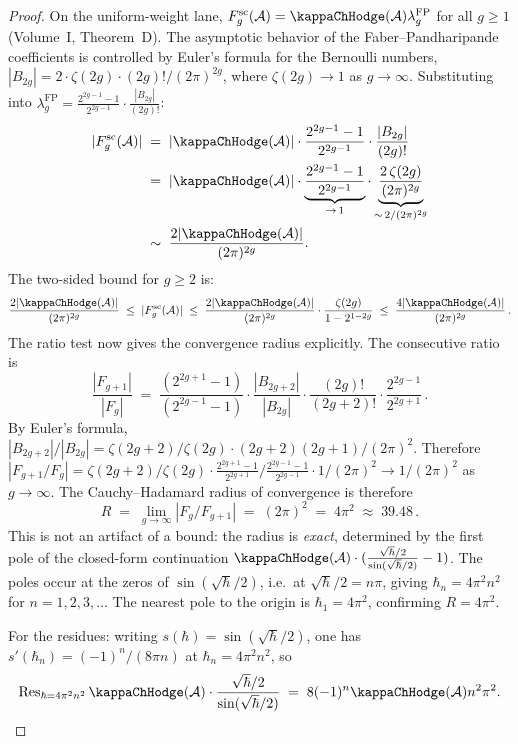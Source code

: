 \begin{proof}
On the uniform-weight lane,
$F_g^{\mathrm{sc}}(\cA)=\kappaChHodge(\cA)\lambda_g^{\mathrm{FP}}$ for all $g \geq 1$
\textup{(}Volume~I, Theorem~D\textup{)}. The asymptotic behavior of
the Faber--Pandharipande coefficients is controlled by Euler's formula for the Bernoulli numbers,
$|B_{2g}| = 2 \cdot \zeta(2g) \cdot (2g)! / (2\pi)^{2g}$, where
$\zeta(2g) \to 1$ as $g \to \infty$. Substituting into $\lambda_g^{\mathrm{FP}} = \frac{2^{2g-1}-1}{2^{2g-1}} \cdot \frac{|B_{2g}|}{(2g)!}$:
\begin{align}
|F_g^{\mathrm{sc}}(\cA)| &\;=\; |\kappaChHodge(\cA)| \cdot \frac{2^{2g-1}-1}{2^{2g-1}} \cdot \frac{|B_{2g}|}{(2g)!} \notag \\
&\;=\; |\kappaChHodge(\cA)| \cdot \underbrace{\frac{2^{2g-1}-1}{2^{2g-1}}}_{\to\,1} \cdot \underbrace{\frac{2\,\zeta(2g)}{(2\pi)^{2g}}}_{\sim\,2/(2\pi)^{2g}} \notag \\
&\;\sim\; \frac{2|\kappaChHodge(\cA)|}{(2\pi)^{2g}}. %
\end{align}
The two-sided bound for $g \geq 2$ is:
\[
\frac{2|\kappaChHodge(\cA)|}{(2\pi)^{2g}} \;\leq\; |F_g^{\mathrm{sc}}(\cA)| \;\leq\; \frac{2|\kappaChHodge(\cA)|}{(2\pi)^{2g}} \cdot \frac{\zeta(2g)}{1 - 2^{1-2g}} \;\leq\; \frac{4|\kappaChHodge(\cA)|}{(2\pi)^{2g}}\,.
\]
The ratio test now gives the convergence radius explicitly. The consecutive ratio is
\[
\frac{|F_{g+1}|}{|F_g|}
\;=\;
\frac{(2^{2g+1}-1)}{(2^{2g-1}-1)}
\cdot
\frac{|B_{2g+2}|}{|B_{2g}|}
\cdot
\frac{(2g)!}{(2g+2)!}
\cdot
\frac{2^{2g-1}}{2^{2g+1}}\,.
\]
By Euler's formula, $|B_{2g+2}|/|B_{2g}| = \zeta(2g+2)/\zeta(2g) \cdot (2g+2)(2g+1)/(2\pi)^2$.
Therefore $|F_{g+1}/F_g| = \zeta(2g+2)/\zeta(2g) \cdot \frac{2^{2g+1}-1}{2^{2g+1}} / \frac{2^{2g-1}-1}{2^{2g-1}} \cdot 1/(2\pi)^2 \to 1/(2\pi)^2$ as $g \to \infty$. The Cauchy--Hadamard radius of convergence is therefore
\[
R \;=\; \lim_{g \to \infty} |F_g/F_{g+1}| \;=\; (2\pi)^2 \;=\; 4\pi^2 \;\approx\; 39.48\,.
\]
This is not an artifact of a bound: the radius is \emph{exact}, determined by the first pole of the closed-form continuation $\kappaChHodge(\cA) \cdot (\frac{\sqrt{\hbar}/2}{\sin(\sqrt{\hbar}/2)} - 1)$. The poles occur at the zeros of $\sin(\sqrt{\hbar}/2)$,
i.e.\ at $\sqrt{\hbar}/2 = n\pi$, giving
$\hbar_n = 4\pi^2 n^2$ for $n = 1, 2, 3, \ldots$ The nearest pole to the origin is $\hbar_1 = 4\pi^2$, confirming $R = 4\pi^2$.

For the residues: writing $s(\hbar)=\sin(\sqrt{\hbar}/2)$, one
has $s'(\hbar_n)=(-1)^n/(8\pi n)$ at $\hbar_n = 4\pi^2 n^2$, so
\[
\Res_{\hbar = 4\pi^2 n^2}
\kappaChHodge(\cA) \cdot \frac{\sqrt{\hbar}/2}{\sin(\sqrt{\hbar}/2)}
\;=\; 8(-1)^n \kappaChHodge(\cA)n^2\pi^2.
\]
\end{proof}

